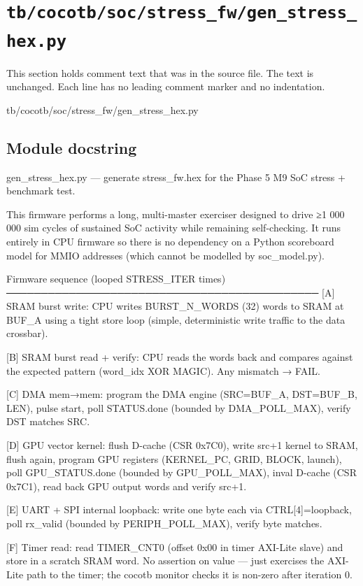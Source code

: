 \section{\texttt{tb/cocotb/soc/stress\_fw/gen\_stress\_hex.py}}\label{tm:suite:soc-stress-fw-gen-stress-hex}

This section holds comment text that was in the source file. The text is unchanged. Each line has no leading comment marker and no indentation.

\begin{relocated}{tb/cocotb/soc/stress_fw/gen_stress_hex.py}

\subsection*{Module docstring}

\begin{textblock}
gen_stress_hex.py — generate stress_fw.hex for the Phase 5 M9 SoC stress + benchmark test.

This firmware performs a long, multi-master exerciser designed to drive ≥1 000 000 sim
cycles of sustained SoC activity while remaining self-checking.  It runs entirely in
CPU firmware so there is no dependency on a Python scoreboard model for MMIO addresses
(which cannot be modelled by soc_model.py).

Firmware sequence (looped STRESS_ITER times)
─────────────────────────────────────────────
[A] SRAM burst write: CPU writes BURST_N_WORDS (32) words to SRAM at BUF_A using
a tight store loop (simple, deterministic write traffic to the data crossbar).

[B] SRAM burst read + verify: CPU reads the words back and compares against the
expected pattern (word_idx XOR MAGIC).  Any mismatch → FAIL.

[C] DMA mem→mem: program the DMA engine (SRC=BUF_A, DST=BUF_B, LEN), pulse start,
poll STATUS.done (bounded by DMA_POLL_MAX), verify DST matches SRC.

[D] GPU vector kernel: flush D-cache (CSR 0x7C0), write src+1 kernel to SRAM,
flush again, program GPU registers (KERNEL_PC, GRID, BLOCK, launch), poll
GPU_STATUS.done (bounded by GPU_POLL_MAX), inval D-cache (CSR 0x7C1), read
back GPU output words and verify src+1.

[E] UART + SPI internal loopback: write one byte each via CTRL[4]=loopback, poll
rx_valid (bounded by PERIPH_POLL_MAX), verify byte matches.

[F] Timer read: read TIMER_CNT0 (offset 0x00 in timer AXI-Lite slave) and store
in a scratch SRAM word.  No assertion on value — just exercises the AXI-Lite
path to the timer; the cocotb monitor checks it is non-zero after iteration 0.


\end{textblock}
\end{relocated}
